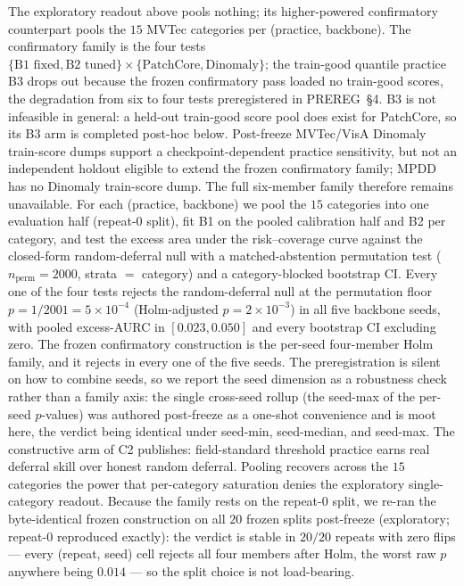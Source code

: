 \documentclass[preprint,11pt]{elsarticle}
\begin{document}
The exploratory readout above pools nothing; its higher-powered confirmatory counterpart pools the
$15$ MVTec categories per (practice, backbone). The confirmatory family is the four tests
$\{\text{B1 fixed},\text{B2 tuned}\}\times\{\text{PatchCore},\text{Dinomaly}\}$; the train-good
quantile practice B3 drops out because the frozen confirmatory pass loaded no train-good scores,
the degradation from six to four tests preregistered in PREREG~\S4. B3 is not infeasible in general:
a held-out train-good score pool does exist for PatchCore, so its B3 arm is completed
post-hoc below. Post-freeze MVTec/VisA Dinomaly train-score dumps support a
checkpoint-dependent practice sensitivity, but not an independent holdout eligible to extend the
frozen confirmatory family; MPDD has no Dinomaly train-score dump. The full six-member
family therefore remains unavailable. For each (practice, backbone) we pool
the $15$ categories into one evaluation half (repeat-$0$ split), fit B1 on the pooled calibration
half and B2 per category, and test the excess area under the risk--coverage curve against the
closed-form random-deferral null with a matched-abstention permutation test
($n_{\text{perm}}=2000$, strata $=$ category) and a category-blocked bootstrap CI. Every one of the
four tests rejects the random-deferral null at the permutation floor
$p=1/2001=5\times10^{-4}$ (Holm-adjusted $p=2\times10^{-3}$) in all five backbone seeds, with
pooled excess-AURC in $[0.023,0.050]$ and every bootstrap CI excluding zero.
The frozen confirmatory construction is the per-seed four-member Holm family,
and it rejects in every one of the five seeds. The preregistration is silent on how to combine
seeds, so we report the seed dimension as a robustness check rather than a family axis: the single
cross-seed rollup (the seed-max of the per-seed $p$-values) was authored post-freeze as a one-shot
convenience and is moot here, the verdict being identical under seed-min, seed-median, and
seed-max. The constructive arm of C2 publishes: field-standard threshold practice earns real
deferral skill over honest random deferral. Pooling recovers across the $15$ categories the power
that per-category saturation denies the exploratory single-category readout. Because the family
rests on the repeat-$0$ split, we re-ran the byte-identical frozen construction on all $20$
frozen splits post-freeze (exploratory; repeat-$0$ reproduced exactly): the verdict is stable in
$20/20$ repeats with zero flips --- every (repeat, seed) cell rejects all four members after
Holm, the worst raw $p$ anywhere being $0.014$ --- so the split choice is not load-bearing.
\end{document}
